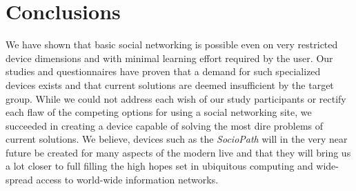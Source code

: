 \section{Conclusions}
%
We have shown that basic social networking is possible even on very restricted 
device dimensions and with minimal learning effort required by the user. 
Our studies and questionnaires have proven that a demand for such specialized 
devices exists and that current solutions are deemed insufficient 
by the target group. While we could not address each wish of our study 
participants or rectify each flaw of the competing options for using 
a social networking site, we succeeded in creating a device capable of 
solving the most dire problems of current solutions. We believe, devices 
such as the \emph{SocioPath} will in the very near future be created for 
many aspects of the modern live and that they will bring us a lot closer 
to full filling the high hopes set in ubiquitous computing and wide-spread 
access to world-wide information networks.
